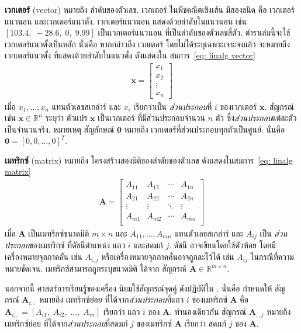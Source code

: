 \textbf{เวกเตอร์} (vector) 
หมายถึง ลำดับของตัวเลข.
เวกเตอร์ ในพีชคณีตเชิงเส้น มีสองชนิด 
คือ เวกเตอร์แนวนอน และเวกเตอร์แนวตั้ง. 
เวกเตอร์แนวนอน
แสดงด้วยลำดับในแนวนอน เช่น\\  $[103.4, \; -28.6, \; 0, \; 9.99]$ เป็นเวกเตอร์แนวนอน ที่เป็นลำดับของตัวเลขสี่ตัว.
ตำราเล่มนี้จะใช้เวกเตอร์แนวตั้งเป็นหลัก
นั่นคือ หากกล่าวถึง เวกเตอร์ โดยไม่ได้ระบุเฉพาะเจาะจงแล้ว จะหมายถึง เวกเตอร์แนวตั้ง ที่แสดงด้วยลำดับในแนวตั้ง 
ดังแสดงใน
สมการ~\ref{eq: linalg vector}
%
\begin{eqnarray}
\bm{x} = \begin{bmatrix}
x_1 \\
x_2 \\
\vdots \\
x_n
\end{bmatrix}
\label{eq: linalg vector}
\end{eqnarray}
เมื่อ $x_1, \ldots, x_n$ แทนตัวเลขสเกล่าร์
และ $x_i$ เรียกว่าเป็น \textit{ส่วนประกอบ}ที่ $i$ ของเวกเตอร์ $\bm{x}$.
%
สัญกรณ์ เช่น $\bm{x} \in \mathbb{R}^n$ ระบุว่า ตัวแปร $\bm{x}$ เป็นเวกเตอร์
ที่มีส่วนประกอบจำนวน $n$ ตัว 
ซึ่ง\textit{ส่วนประกอบ}แต่ละตัวเป็นจำนวนจริง.
หมายเหตุ 
สัญลักษณ์ $\bm{0}$ หมายถึง
เวกเตอร์ที่ส่วนประกอบทุกตัวเป็นศูนย์.
นั่นคือ $\bm{0} = [0, 0, \ldots, 0]^T$.

\textbf{เมทริกซ์} (matrix)
หมายถึง โครงสร้างสองมิติของลำดับของตัวเลข
ดังแสดงในสมการ~\ref{eq: linalg matrix}
%
\begin{eqnarray}
\bm{A} = \begin{bmatrix}
A_{11} & A_{12} & \cdots & A_{1n} \\
A_{21} & A_{22} & \cdots & A_{2n} \\
\vdots & \vdots & \ddots & \vdots \\
A_{m1} & A_{m2} & \cdots & A_{mn} \\
\end{bmatrix}
\label{eq: linalg matrix}
\end{eqnarray}
เมื่อ $\bm{A}$ เป็นเมทริกซ์ขนาดมิติ $m \times n$ และ $A_{11}, \ldots, A_{mn}$ แทนตัวเลขสเกล่าร์ และ $A_{ij}$ เป็น \textit{ส่วนประกอบ}ของเมทริกซ์ ที่ดัชนีตำแหน่ง แถว $i$ และสดมภ์ $j$.
ดัชนี อาจเขียนโดยใช้ตัวห้อย โดยมีเครื่องหมายจุลภาคคั่น เช่น $A_{i,j}$
หรือเครื่องหมายจุลภาคคั่นอาจถูกละไว้ได้
เช่น $A_{ij}$ ในกรณีที่ความหมายชัดเจน.
%
เมทริกซ์สามารถถูกระบุขนาดมิติ ได้จาก
สัญกรณ์ $\bm{A} \in \mathbb{R}^{m \times n}$.

นอกจากนี้ ศาสตร์การเรียนรู้ของเครื่อง 
นิยมใช้สัญกรณ์จุดคู่ ดังปฏิบัติใน \cite{GoodfellowEtAl2016}.
นั่นคือ กำหนดให้
สัญกรณ์ $\bm{A}_{i,:}$ 
หมายถึง เมทริกซ์ย่อย ที่ได้จาก\textit{ส่วนประกอบ}ที่แถว $i$ ของเมทริกซ์ $\bm{A}$ 
คือ
$\bm{A}_{i,:} = [A_{i1}, \; A_{i2}, \; \ldots, \; A_{in}]$
เรียกว่า แถว $i$ ของ $\bm{A}$.
ทำนองเดียวกัน
สัญกรณ์ $\bm{A}_{:,j}$ หมายถึง เมทริกซ์ย่อย ที่ได้จาก\textit{ส่วนประกอบ}ที่สดมภ์ $j$ ของเมทริกซ์ $\bm{A}$ เรียกว่า สดมภ์ $j$ ของ $\bm{A}$.

